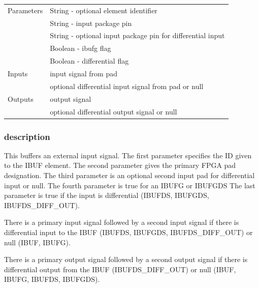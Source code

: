 \documentclass[10pt,a4paper,twoside,fleqn]{book}
\begin{document}
                    \begin{tabular}{| l | l |}
                    \hline
                    Parameters  & String  - optional element identifier \\
                                & String  - input package pin \\
                                & String  - optional input package pin for differential input\\
                                & Boolean - ibufg flag \\
                                & Boolean - differential flag \\
                    \hline
                    Inputs      & input signal from pad \\
                                & optional differential input signal from pad or null \\
                    \hline
                    Outputs     & output signal \\
                                & optional differential output signal or null \\
                    \hline
                    \end{tabular}

                \subsubsection{description}

                    This buffers an external input signal. The first parameter
                    specifies the ID given to the IBUF element. The second
                    parameter gives the primary FPGA pad designation. The third
                    parameter is an optional second input pad for differential
                    input or null. The fourth parameter is true for an IBUFG or
                    IBUFGDS The last parameter is true if the input is
                    differential (IBUFDS, IBUFGDS, IBUFDS\_DIFF\_OUT).

                    There is a primary input signal followed by a second input
                    signal if there is differential input to the IBUF (IBUFDS,
                    IBUFGDS, IBUFDS\_DIFF\_OUT) or null (IBUF, IBUFG).

                    There is a primary output signal followed by a second output
                    signal if there is differential output from the IBUF
                    (IBUFDS\_DIFF\_OUT) or null (IBUF, IBUFG, IBUFDS, IBUFGDS).
\end{document}
